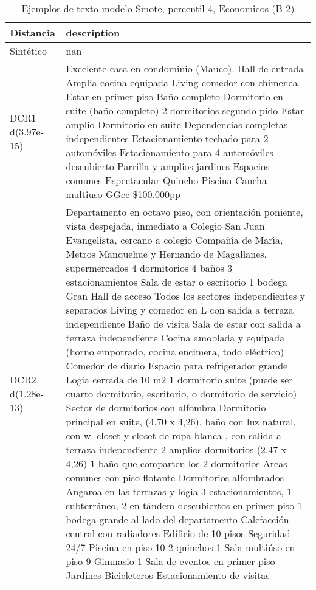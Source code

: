\begin{table}[H]
\centering
\fontsize{10}{14}\selectfont
\caption{Ejemplos de texto modelo Smote, percentil 4, Economicos (B-2)}
\label{table-example-economicos-b-2-smote-enc-4p-text}
\begin{tabular}{|l|m{35em}|}
\hline
\rowcolor[gray]{0.8}
Distancia & description \\
\hline Sintético & nan \\
\hline DCR1 d(3.97e-15) & Excelente casa en condominio (Mauco).
Hall de entrada
Amplia cocina  equipada
Living-comedor con chimenea
Estar en primer piso
Ba\~no completo
Dormitorio en suite (ba\~no completo)
2 dormitorios
segundo pido
Estar amplio
Dormitorio en suite
Dependencias completas independientes
Estacionamiento techado para 2 autom\'oviles
Estacionamiento para 4 autom\'oviles descubierto
Parrilla y amplios jardines
Espacios comunes
Espectacular Quincho
Piscina
Cancha multiuso
GGcc \$100.000pp \\
\hline DCR2 d(1.28e-13) & Departamento en octavo piso, con orientaci\'on poniente, vista despejada, inmediato a Colegio San Juan Evangelista, cercano a colegio Compa\~n{\'\i}a de Mar{\'\i}a, Metros Manquehue y Hernando de Magallanes, supermercados  4 dormitorios 4 ba\~nos 3 estacionamientos Sala de estar o escritorio 1 bodega  Gran Hall de acceso Todos los sectores independientes y separados Living y comedor en L con salida a terraza independiente Ba\~no de visita Sala de estar con salida a terraza independiente  Cocina amoblada y equipada (horno empotrado, cocina encimera, todo el\'ectrico) Comedor de diario Espacio para refrigerador grande Logia cerrada de 10 m2 1 dormitorio suite (puede ser cuarto dormitorio, escritorio, o dormitorio de servicio)  Sector de dormitorios con alfombra Dormitorio principal en suite, (4,70 x 4,26), ba\~no con luz natural, con w. closet y closet de ropa blanca , con salida a terraza independiente 2 amplios dormitorios (2,47 x 4,26) 1 ba\~no que comparten los 2 dormitorios  Areas comunes con piso flotante Dormitorios alfombrados Angaroa en las terrazas y logia  3 estacionamientos, 1 subterr\'aneo, 2 en t\'andem descubiertos en primer piso 1 bodega grande al lado del departamento Calefacci\'on central con radiadores  Edificio de 10 pisos Seguridad 24/7 Piscina en piso 10 2 quinchos 1 Sala multi\'uso en piso 9 Gimnasio 1 Sala de eventos en primer piso Jardines Bicicleteros Estacionamiento de visitas \\
\hline
\end{tabular}
\end{table}
